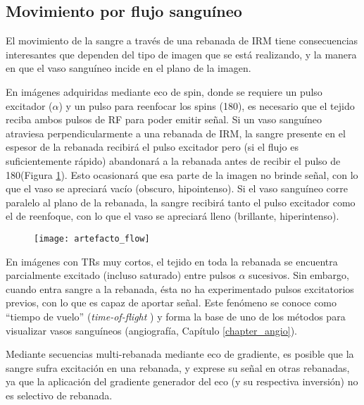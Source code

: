 \subsection{Movimiento por flujo sanguíneo}
El movimiento de la sangre a través de una rebanada de IRM tiene consecuencias interesantes que dependen del tipo de imagen que se está realizando, y la manera en que el vaso sanguíneo incide en el plano de la imagen. 

En imágenes adquiridas mediante eco de spin, donde se requiere un pulso excitador ($\alpha$\degrees) y un pulso para reenfocar los spins (180\degrees), es necesario que el tejido reciba ambos pulsos de RF para poder emitir señal. Si un vaso sanguíneo atraviesa perpendicularmente a una rebanada de IRM, la sangre presente en el espesor de la rebanada recibirá el pulso excitador pero (si el flujo es suficientemente rápido) abandonará a la rebanada antes de recibir el pulso de 180\degrees (Figura \ref{fig:artefacto_flow}). Esto ocasionará que esa parte de la imagen no brinde señal, con lo que el vaso se apreciará vacío (obscuro, hipointenso). Si el vaso sanguíneo corre paralelo al plano de la rebanada, la sangre recibirá tanto el pulso excitador como el de reenfoque, con lo que el vaso se apreciará lleno (brillante, hiperintenso).

\begin{figure}[htb]
 \begin{figg}
   \texttt{[image: artefacto\_flow]}
   \caption{\figurapendiente}
 \label{fig:artefacto_flow}
 \end{figg}
\end{figure}

En imágenes con TRs muy cortos, el tejido en toda la rebanada se encuentra parcialmente excitado (incluso saturado) entre pulsos $\alpha$ sucesivos. Sin embargo, cuando entra sangre a la rebanada, ésta no ha experimentado pulsos excitatorios previos, con lo que es capaz de aportar señal. Este fenómeno se conoce como ``tiempo de vuelo'' (\textit{time-of-flight} ) y forma la base de uno de los métodos para visualizar vasos sanguíneos (angiografía, Capítulo \ref{chapter_angio}). 

Mediante secuencias multi-rebanada mediante eco de gradiente, es posible que la sangre sufra excitación en una rebanada, y exprese su señal en otras rebanadas, ya que la aplicación del gradiente generador del eco (y su respectiva inversión) no es selectivo de rebanada. 




